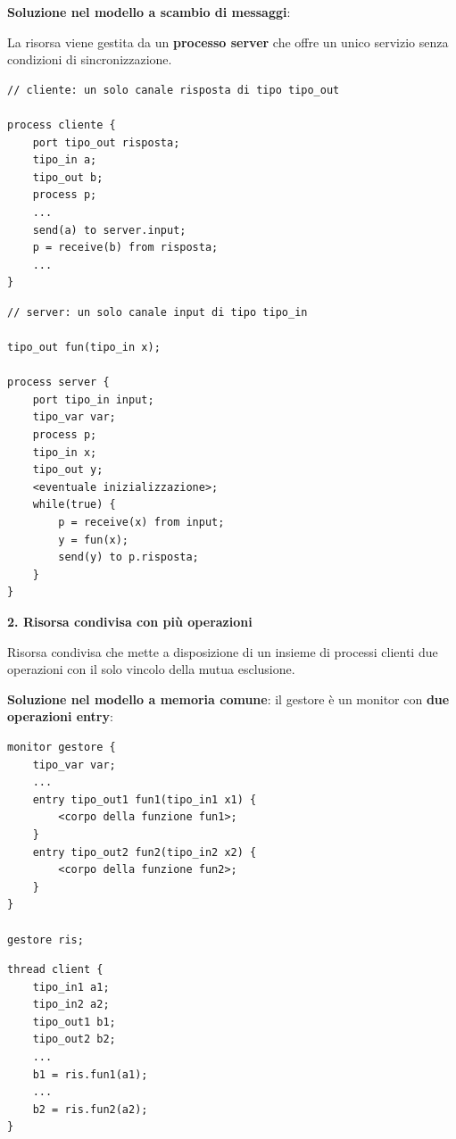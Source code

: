 \documentclass{article}
\begin{document}
\vspace{3mm}
\textbf{Soluzione nel modello a scambio di messaggi}:

La risorsa viene gestita da un \textbf{processo server} che offre un unico servizio senza condizioni di sincronizzazione.

\noindent
\begin{minipage}{.45\columnwidth}
\begin{lstlisting}
// cliente: un solo canale risposta di tipo tipo_out

process cliente {
    port tipo_out risposta;
    tipo_in a;
    tipo_out b;
    process p;
    ...
    send(a) to server.input;
    p = receive(b) from risposta;
    ...
}
\end{lstlisting}
\end{minipage}\hfill
\begin{minipage}{.45\columnwidth}
\begin{lstlisting}
// server: un solo canale input di tipo tipo_in

tipo_out fun(tipo_in x);

process server {
    port tipo_in input;
    tipo_var var;
    process p;
    tipo_in x;
    tipo_out y;
    <eventuale inizializzazione>;
    while(true) {
        p = receive(x) from input;
        y = fun(x);
        send(y) to p.risposta;
    }
}
\end{lstlisting}
\end{minipage}

\vspace{5mm}
{\large \textbf{2. Risorsa condivisa con più operazioni}}

\vspace{3mm}
Risorsa condivisa che mette a disposizione di un insieme di processi clienti due operazioni con il solo vincolo della mutua esclusione.

\vspace{3mm}
\textbf{Soluzione nel modello a memoria comune}: il gestore è un monitor con \textbf{due operazioni entry}:

\noindent
\begin{minipage}{.45\columnwidth}
\begin{lstlisting}
monitor gestore {
    tipo_var var;
    ...
    entry tipo_out1 fun1(tipo_in1 x1) {
        <corpo della funzione fun1>;
    }
    entry tipo_out2 fun2(tipo_in2 x2) {
        <corpo della funzione fun2>;
    }
}

gestore ris;
\end{lstlisting}
\end{minipage}\hfill
\begin{minipage}{.45\columnwidth}
\begin{lstlisting}
thread client {
    tipo_in1 a1;
    tipo_in2 a2;
    tipo_out1 b1;
    tipo_out2 b2;
    ...
    b1 = ris.fun1(a1);
    ...
    b2 = ris.fun2(a2);
}
\end{lstlisting}
\end{minipage}
\end{document}
